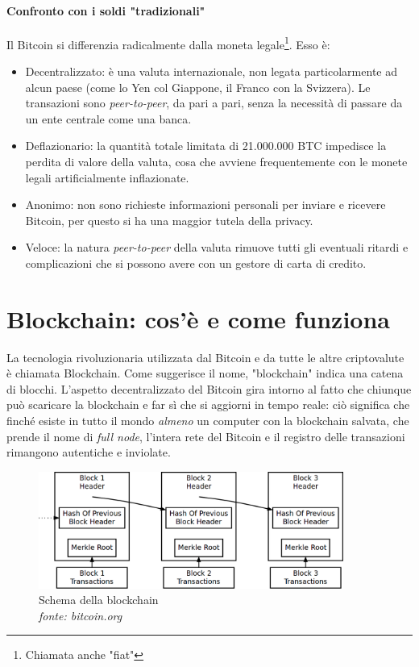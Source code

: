 \documentclass {article}
\begin{document}
\paragraph {Confronto con i soldi "tradizionali"}

Il Bitcoin si differenzia radicalmente dalla moneta legale\footnote{Chiamata anche "fiat"}.
Esso è:

\begin{itemize}
\item Decentralizzato: è una valuta internazionale, non legata particolarmente ad alcun paese (come lo Yen col Giappone, il Franco con la Svizzera). Le transazioni sono \textit{peer-to-peer}, da pari a pari, senza la necessità di passare da un ente centrale come una banca.
\item Deflazionario: la quantità totale limitata di 21.000.000 BTC impedisce la perdita di valore della valuta, cosa che avviene frequentemente con le monete legali artificialmente inflazionate.
\item Anonimo: non sono richieste informazioni personali per inviare e ricevere Bitcoin, per questo si ha una maggior tutela della privacy.
\item Veloce: la natura \textit{peer-to-peer} della valuta rimuove tutti gli eventuali ritardi e complicazioni che si possono avere con un gestore di carta di credito.
\end{itemize}


\newpage
\null
\newpage


\section {Blockchain: cos'è e come funziona}


La tecnologia rivoluzionaria utilizzata dal Bitcoin e da tutte le altre criptovalute è chiamata Blockchain.
Come suggerisce il nome, "blockchain" indica una catena di blocchi.
L'aspetto decentralizzato del Bitcoin gira intorno al fatto che chiunque può scaricare la blockchain e far sì che si aggiorni in tempo reale: ciò significa che finché esiste in tutto il mondo \emph{almeno} un computer con la blockchain salvata, che prende il nome di \textit{full node}, l'intera rete del Bitcoin e il registro delle transazioni rimangono autentiche e inviolate.

\vspace {0.5cm}
\begin{figure}[htb!]
\includegraphics [width = 10cm] {blockchain2.png}
\centering
\caption {Schema della blockchain\\\textit{fonte: bitcoin.org}}
\end{figure}
\end{document}
